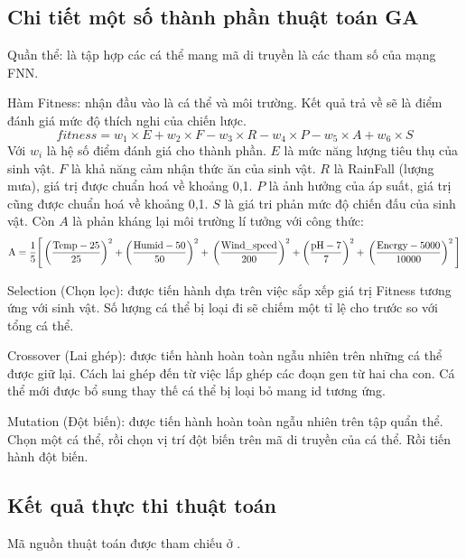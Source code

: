 \subsection{Chi tiết một số thành phần thuật toán GA}
	Quần thể: là tập hợp các cá thể mang mã di truyền là các tham số của mạng FNN.
	
	Hàm Fitness: nhận đầu vào là cá thể và môi trường. Kết quả trả về sẽ là điểm đánh giá mức độ thích nghi của chiến lược. 
	\begin{equation}
		fitness = w_1 \times E + w_2 \times F - w_3 \times R - w_4 \times P - w_5 \times A + w_6 \times S
	\end{equation}
	Với $w_i$ là hệ số điểm đánh giá cho thành phần. $E$ là mức năng lượng tiêu thụ của sinh vật. $F$ là khả năng cảm nhận thức ăn của sinh vật. $R$ là RainFall (lượng mưa), giá trị được chuẩn hoá về khoảng 0,1. $P$ là ảnh hưởng của áp suất, giá trị cũng được chuẩn hoá về khoảng 0,1.
	$S$ là giá tri phản mức độ chiến đấu của sinh vật. Còn $A$ là phản kháng lại môi trường lí tưởng với công thức:
	\begin{equation}
	\text{A} =
	\frac{1}{5} \Bigg[
	\left( \frac{\text{Temp} - 25}{25} \right)^2 +
	\left( \frac{\text{Humid} - 50}{50} \right)^2 + \\
	\left( \frac{\text{Wind\_speed}}{200} \right)^2 +
	\left( \frac{\text{pH} - 7}{7} \right)^2 + \\
	\left( \frac{\text{Energy} - 5000}{10000} \right)^2
	\Bigg]
	\end{equation}
	
	Selection (Chọn lọc): được tiến hành dựa trên việc sắp xếp giá trị Fitness tương ứng với sinh vật. Số lượng cá thể bị loại đi sẽ chiếm một tỉ lệ cho trước so với tổng cá thể.
	
	Crossover (Lai ghép): được tiến hành hoàn toàn ngẫu nhiên trên những cá thể được giữ lại. Cách lai ghép đến từ việc lắp ghép các đoạn gen từ hai cha con. Cá thể mới được bổ sung thay thế cá thể bị loại bỏ mang id tương ứng.
	
	Mutation (Đột biến): được tiến hành hoàn toàn ngẫu nhiên trên tập quẩn thể. Chọn một cá thể, rồi chọn vị trí đột biến trên mã di truyền của cá thể. Rồi tiến hành đột biến.

\subsection{Kết quả thực thi thuật toán}
	Mã nguồn thuật toán được tham chiếu ở \cite{baolam}.
	
